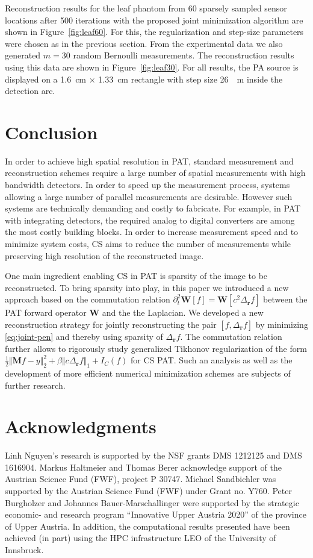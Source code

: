 \documentclass[11pt]{article}
\newcommand{\rr}{\mathbf r}
\newcommand{\data}{y}
\newcommand{\source}{f}
\newcommand\norm[1]{\Vert#1\Vert}
\newcommand{\fullop}{\mathbf M}
\newcommand{\wave}{\mathbf W}
\begin{document}
Reconstruction results for the leaf phantom from 60 sparsely sampled sensor locations after 500 iterations with the proposed joint minimization algorithm are shown in
Figure~\ref{fig:leaf60}.
For this, the regularization and step-size parameters were chosen as in the previous section. From the experimental data we also generated $m=30$
random Bernoulli measurements. The reconstruction results using this data are
shown in Figure~\ref{fig:leaf30}. For all results, the  PA  source
is displayed on  a \SI{1.6}{cm} $\times$  \SI{1.33}{cm} rectangle with step size
\SI{26}{\mu m} inside  the detection arc.

\section{Conclusion}
\label{sec:conclusion}

In order to achieve high spatial resolution in PAT, standard measurement
and  reconstruction  schemes require a large number of
spatial measurements with high bandwidth detectors. In order to speed up the
measurement process,  systems allowing a large number of parallel measurements are desirable. However  such systems are technically demanding and costly to fabricate.
For example, in PAT with  integrating detectors, the required analog to digital converters
are among the most   costly building blocks. In order to increase measurement speed and to
minimize   system costs, CS aims to reduce the  number of measurements
while preserving  high resolution of the reconstructed image.

One main ingredient enabling CS in PAT is  sparsity of the image to be reconstructed.
To bring sparsity into play, in this paper we introduced a new  approach based on the
commutation  relation $\partial_t^2 \wave  [\source] = \wave  [c^2 \Delta_{\rr} \source]$
between the PAT forward operator $\wave$ and the the Laplacian. We developed a
new reconstruction strategy for jointly reconstructing the pair $[\source,  \Delta_{\rr} \source]$
by minimizing  \eqref{eq:joint-pen} and thereby using sparsity of  $\Delta_{\rr} \source$.
The commutation relation further allows to rigorously study  generalized
Tikhonov regularization of the form $\frac{1}{2} \norm { \fullop\source - \data } _2^2  +
\beta \norm{c\Delta_{\rr} \source}_1  +  I_{C} (\source)$ for CS PAT. Such an analysis
as well as the  development of more efficient numerical minimization schemes are
subjects of  further research.


\section*{Acknowledgments}
	Linh Nguyen's research is supported by the NSF grants DMS 1212125 and DMS 1616904. Markus  Haltmeier and Thomas Berer acknowledge support of the Austrian Science Fund (FWF), project P 30747.
Michael Sandbichler was supported by the Austrian Science Fund (FWF) under Grant no. Y760. Peter Burgholzer and Johannes Bauer-Marschallinger were supported by the strategic economic- and research program ``Innovative Upper Austria 2020'' of the province of Upper Austria. In addition, 
 the computational results presented have been achieved (in part) using the HPC infrastructure LEO of the University of Innsbruck.
\end{document}
